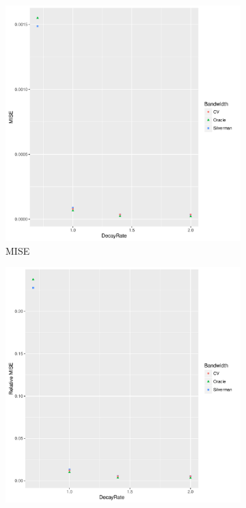 \begin{figure}[htbp]
    \centering
    \begin{subfigure}[b]{0.3\textwidth}
    \includegraphics[width=\textwidth]{results/by_population_decay/MISE-vs-population-decay}
    \caption{MISE}
    \end{subfigure}
    \begin{subfigure}[b]{0.3\textwidth}
    \includegraphics[width=\textwidth]{results/by_population_decay/RMISE-vs-population-decay}

\end{subfigure}
\end{figure}
